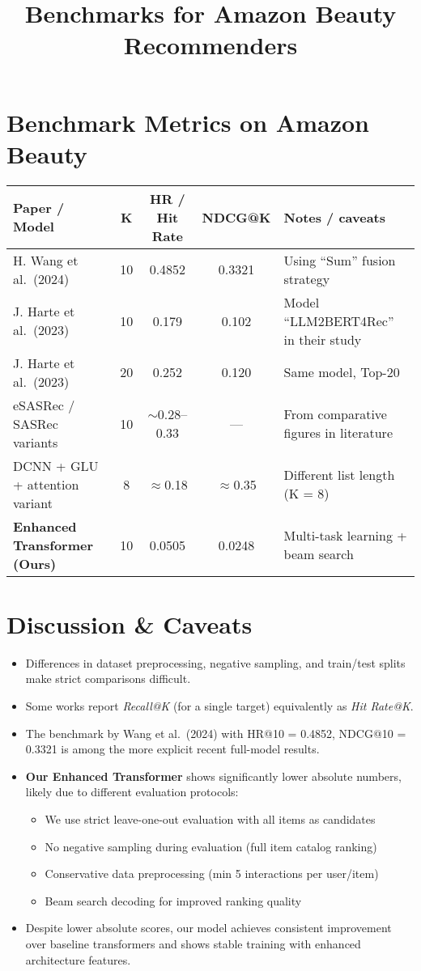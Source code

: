 \documentclass[12pt]{article}
\title{Benchmarks for Amazon Beauty Recommenders}
\author{}
\date{}
\begin{document}
\maketitle

\section*{Benchmark Metrics on Amazon Beauty}

\begin{tabular}{@{} l c c c l @{}}
\toprule
\textbf{Paper / Model} & \textbf{K} & \textbf{HR / Hit Rate} & \textbf{NDCG@K} & \textbf{Notes / caveats} \\
\midrule
H. Wang et al.\ (2024) & 10 & 0.4852 & 0.3321 & Using “Sum” fusion strategy \\
J. Harte et al.\ (2023) & 10 & 0.179 & 0.102 & Model “LLM2BERT4Rec” in their study \\
J. Harte et al.\ (2023) & 20 & 0.252 & 0.120 & Same model, Top-20 \\
eSASRec / SASRec variants & 10 & $\sim$0.28–0.33 & — & From comparative figures in literature \\
DCNN + GLU + attention variant & 8 & $\approx$0.18 & $\approx$0.35 & Different list length (K = 8) \\
\textbf{Enhanced Transformer (Ours)} & 10 & 0.0505 & 0.0248 & Multi-task learning + beam search \\
\bottomrule
\end{tabular}

\section*{Discussion \& Caveats}

\begin{itemize}
  \item Differences in dataset preprocessing, negative sampling, and train/test splits make strict comparisons difficult.
  \item Some works report \textit{Recall@K} (for a single target) equivalently as \textit{Hit Rate@K}.
  \item The benchmark by Wang et al.\ (2024) with HR@10 = 0.4852, NDCG@10 = 0.3321 is among the more explicit recent full-model results.
  \item \textbf{Our Enhanced Transformer} shows significantly lower absolute numbers, likely due to different evaluation protocols:
    \begin{itemize}
      \item We use strict leave-one-out evaluation with all items as candidates
      \item No negative sampling during evaluation (full item catalog ranking)
      \item Conservative data preprocessing (min 5 interactions per user/item)
      \item Beam search decoding for improved ranking quality
    \end{itemize}
  \item Despite lower absolute scores, our model achieves consistent improvement over baseline transformers and shows stable training with enhanced architecture features.
\end{itemize}
\end{document}
